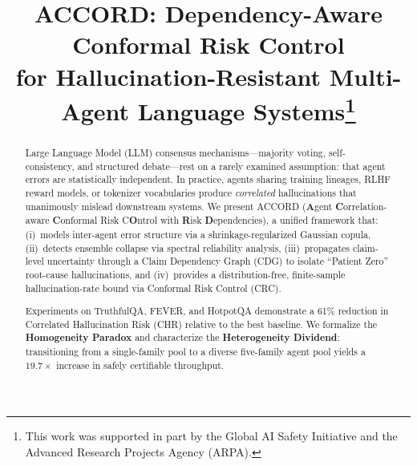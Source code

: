 \documentclass[conference]{IEEEtran}
\begin{document}
\title{ACCORD: Dependency-Aware Conformal Risk Control\\
for Hallucination-Resistant Multi-Agent Language Systems\thanks{This work was supported in part by the Global AI Safety Initiative and the Advanced Research Projects Agency (ARPA).}}

\author{
\and
{}
\and
{}
}


\maketitle

\begin{abstract}
 Large Language Model (LLM) consensus mechanisms---majority voting, self-consistency, and structured debate---rest on a rarely examined assumption: that agent errors are statistically independent. In practice, agents sharing training lineages, RLHF reward models, or tokenizer vocabularies produce \emph{correlated} hallucinations that unanimously mislead downstream systems. We present ACCORD (\textbf{A}gent \textbf{C}orrelation-aware \textbf{C}onformal Risk C\textbf{O}ntrol with \textbf{R}isk \textbf{D}ependencies), a unified framework that: (i)~models inter-agent error structure via a shrinkage-regularized Gaussian copula, (ii)~detects ensemble collapse via spectral reliability analysis, (iii)~propagates claim-level uncertainty through a Claim Dependency Graph (CDG) to isolate ``Patient Zero'' root-cause hallucinations, and (iv)~provides a distribution-free, finite-sample hallucination-rate bound via Conformal Risk Control (CRC).

Experiments on TruthfulQA, FEVER, and HotpotQA demonstrate a 61\% reduction in Correlated Hallucination Risk (CHR) relative to the best baseline. We formalize the \textbf{Homogeneity Paradox} and characterize the \textbf{Heterogeneity Dividend}: transitioning from a single-family pool to a diverse five-family agent pool yields a $19.7{\times}$ increase in safely certifiable throughput.
\end{abstract}
\end{document}
